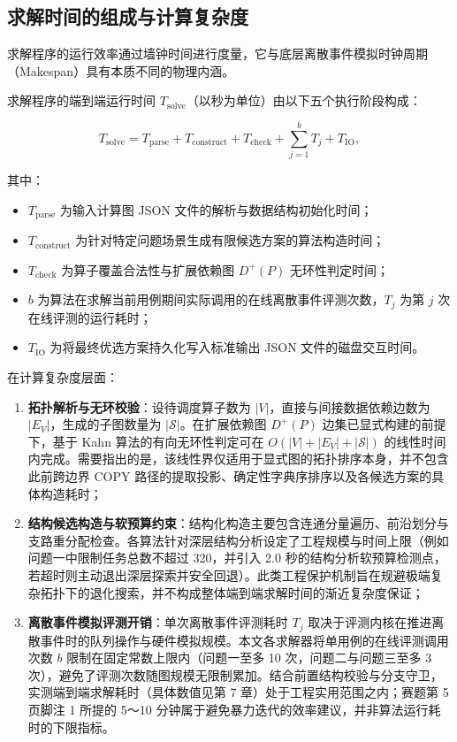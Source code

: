 \documentclass[anonymous,withtoc]{gmcm2026}
\providecommand{\tightlist}{\setlength{\itemsep}{0pt}\setlength{\parskip}{0pt}}
\begin{document}
\subsection{求解时间的组成与计算复杂度}

求解程序的运行效率通过墙钟时间进行度量，它与底层离散事件模拟时钟周期（Makespan）具有本质不同的物理内涵。

求解程序的端到端运行时间 \(T_{\mathrm{solve}}\)（以秒为单位）由以下五个执行阶段构成：

\begin{equation}
T_{\mathrm{solve}} = T_{\mathrm{parse}} + T_{\mathrm{construct}} + T_{\mathrm{check}} + \sum_{j=1}^{b} T_j + T_{\mathrm{IO}},
\end{equation}

其中：

\begin{itemize}
\tightlist
\item
  \(T_{\mathrm{parse}}\) 为输入计算图 JSON 文件的解析与数据结构初始化时间；
\item
  \(T_{\mathrm{construct}}\) 为针对特定问题场景生成有限候选方案的算法构造时间；
\item
  \(T_{\mathrm{check}}\) 为算子覆盖合法性与扩展依赖图 \(D^+(P)\) 无环性判定时间；
\item
  \(b\) 为算法在求解当前用例期间实际调用的在线离散事件评测次数，\(T_j\) 为第 \(j\) 次在线评测的运行耗时；
\item
  \(T_{\mathrm{IO}}\) 为将最终优选方案持久化写入标准输出 JSON 文件的磁盘交互时间。
\end{itemize}

在计算复杂度层面：

\begin{enumerate}
\def\labelenumi{\arabic{enumi}.}
\tightlist
\item
  \textbf{拓扑解析与无环校验}：设待调度算子数为 \(|V|\)，直接与间接数据依赖边数为 \(|E_V|\)，生成的子图数量为 \(|\mathcal{S}|\)。在扩展依赖图 \(D^+(P)\) 边集已显式构建的前提下，基于 Kahn 算法\cite{ref19}的有向无环性判定可在 \(O(|V| + |E_V| + |\mathcal{S}|)\) 的线性时间内完成。需要指出的是，该线性界仅适用于显式图的拓扑排序本身，并不包含此前跨边界 COPY 路径的提取投影、确定性字典序排序以及各候选方案的具体构造耗时；
\item
  \textbf{结构候选构造与软预算约束}：结构化构造主要包含连通分量遍历、前沿划分与支路重分配检查。各算法针对深层结构分析设定了工程规模与时间上限（例如问题一中限制任务总数不超过 320，并引入 2.0 秒的结构分析软预算检测点，若超时则主动退出深层探索并安全回退）。此类工程保护机制旨在规避极端复杂拓扑下的退化搜索，并不构成整体端到端求解时间的渐近复杂度保证；
\item
  \textbf{离散事件模拟评测开销}：单次离散事件评测耗时 \(T_j\) 取决于评测内核在推进离散事件时的队列操作与硬件模拟规模。本文各求解器将单用例的在线评测调用次数 \(b\) 限制在固定常数上限内（问题一至多 10 次，问题二与问题三至多 3 次），避免了评测次数随图规模无限制累加。结合前置结构校验与分支守卫，实测端到端求解耗时（具体数值见第 7 章）处于工程实用范围之内；赛题第 5 页脚注 1 所提的 5～10 分钟属于避免暴力迭代的效率建议，并非算法运行耗时的下限指标。
\end{enumerate}
\end{document}
